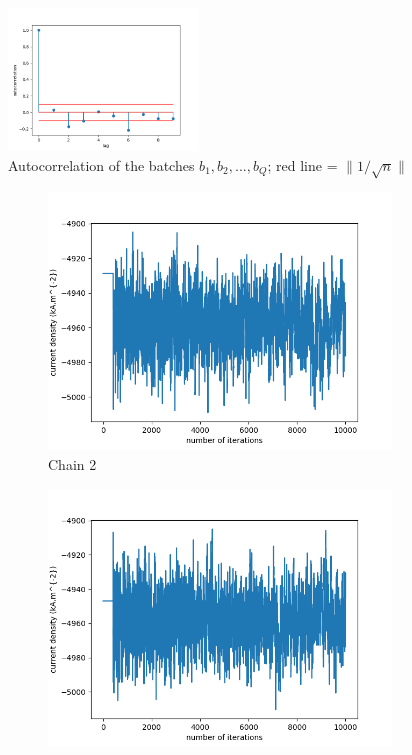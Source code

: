 \documentclass[10pt]{proc}
\begin{document}
\begin{figure}[ht]
  \centering
  \includegraphics[width=0.45\textwidth]{batch_acf.png}
  \caption{Autocorrelation of the batches $b_1,b_2,...,b_Q$; red line = $\|{1/\sqrt{n}}\|$}
  \label{fig:batch_acf}
\end{figure}

\begin{figure}[htp]
\centering
\begin{subfigure}[t]{0.49\textwidth}
  \includegraphics[width=\textwidth]{chain_2.png}
  \caption{Chain 2}
\end{subfigure}
\begin{subfigure}[t]{0.49\textwidth}
  \includegraphics[width=\textwidth]{chain_3.png}

\end{subfigure}
\end{figure}
\end{document}
